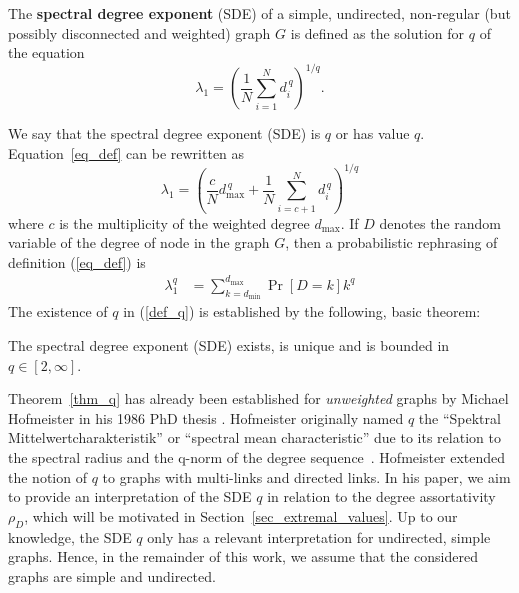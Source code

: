 \documentclass{comnet}%
\begin{document}
\begin{definition}\label{def_q}
	The \textbf{spectral degree exponent} (SDE) of a simple, undirected, non-regular (but possibly disconnected and weighted) graph $G$ is defined as the solution for $q$ of the equation
	\begin{equation}\label{eq_def}
		\lambda_1 = \left( \frac{1}{N} \sum_{i=1}^N d_i^{\, q} \right)^{1/q}.
	\end{equation}
\end{definition}
We say that the spectral degree exponent (SDE) is $q$ or has value $q$. Equation~\eqref{eq_def} can be rewritten as
\begin{equation}\label{eq_relation_dmax}
	\lambda_1 = \left( \frac{c}{N} d_{\max}^{\, q} + \frac{1}{N} \sum_{i=c+1}^N d_i^{\, q} \right)^{1/q}
\end{equation}
where $c$ is the multiplicity of the weighted degree $d_{\max}$. If $D$ denotes the random variable of the degree of node in the graph $G$, then a probabilistic rephrasing of definition (\ref{eq_def}) is
\begin{align}
	\lambda_{1}^{q}  &  =\sum_{k=d_{\min}}^{d_{\max}}\Pr\left[  D=k\right]
	k^{q} \label{def_SDE_probabilitistic}%
\end{align}
The existence of $q$ in (\ref{def_q}) is established by the following, basic theorem:
\begin{theorem}\label{thm_q}
	The spectral degree exponent (SDE) exists, is unique and is bounded in $q \in [2,\infty]$.
\end{theorem}




Theorem~\ref{thm_q} has already been established for \emph{unweighted} graphs by Michael Hofmeister in his 1986 PhD thesis \cite{HofmeisterThesis}. Hofmeister originally named $q$ the ``Spektral Mittelwertcharakteristik'' or ``spectral mean characteristic'' due to its relation to the spectral radius and the q-norm of the degree sequence~\cite{hofmeister1988spectralradius}. Hofmeister \cite{HofmeisterThesis,hofmeister1988spectralradius} extended the notion of $q$ to graphs with multi-links and directed links. In his paper, we aim to provide an interpretation of the SDE $q$ in relation to the degree assortativity $\rho_D$, which will be motivated in Section~\ref{sec_extremal_values}. Up to our knowledge, the SDE $q$ only has a relevant interpretation for undirected, simple graphs. Hence, in the remainder of this work, we assume that the considered graphs are simple and undirected.
\end{document}
